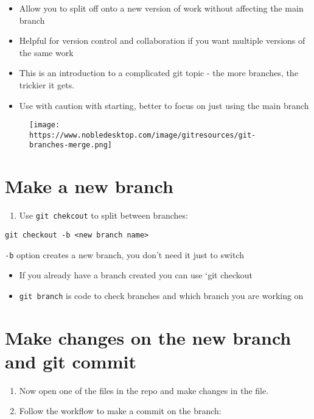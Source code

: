 \documentclass[]{article}
\providecommand{\tightlist}{%
  \setlength{\itemsep}{0pt}\setlength{\parskip}{0pt}}
\begin{document}
\begin{itemize}
\tightlist
\item
  Allow you to split off onto a new version of work without affecting
  the main branch
\item
  Helpful for version control and collaboration if you want multiple
  versions of the same work
\item
  This is an introduction to a complicated git topic - the more
  branches, the trickier it gets.
\item
  Use with caution with starting, better to focus on just using the main
  branch
\end{itemize}

\begin{figure}
\centering
\texttt{[image: https://www.nobledesktop.com/image/gitresources/git-branches-merge.png]}
\caption{}
\end{figure}

\section{Make a new branch}\label{make-a-new-branch}

\begin{enumerate}
\def\labelenumi{\arabic{enumi}.}
\tightlist
\item
  Use \texttt{git\ chekcout} to split between branches:
\end{enumerate}

\texttt{git\ checkout\ -b\ \textless{}new\ branch\ name\textgreater{}}

\texttt{-b} option creates a new branch, you don't need it just to
switch

\begin{itemize}
\item
  If you already have a branch created you can use `git checkout 
\item
  \texttt{git\ branch} is code to check branches and which branch you
  are working on
\end{itemize}

\section{Make changes on the new branch and git
commit}\label{make-changes-on-the-new-branch-and-git-commit}

\begin{enumerate}
\def\labelenumi{\arabic{enumi}.}
\setcounter{enumi}{1}
\item
  Now open one of the files in the repo and make changes in the file.
\item
  Follow the workflow to make a commit on the branch:
\end{enumerate}
\end{document}
